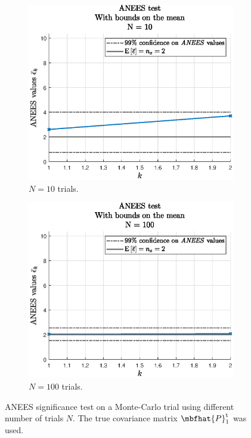 \documentclass{simple-article}
\begin{document}
\begin{figure}[H]
  \centering
  \begin{subfigure}{0.45\textwidth}
    \includegraphics[width=\textwidth]{../figs/anees_N10.eps}
    \caption{$N=10$ trials.}
    \label{fig:anees_N10}
  \end{subfigure}
  \begin{subfigure}{0.45\textwidth}
    \includegraphics[width=\textwidth]{../figs/anees_N100.eps}
    \caption{$N=100$ trials.}
    \label{fig:anees_N100}
  \end{subfigure}
  \caption{ANEES significance test on a Monte-Carlo trial using different number of trials $N$. The true covariance matrix $\mbfhat{P}_{1}^{\mathrm{t}}$ was used.}
  \label{fig:ANEES KF MCT true P}
\end{figure}
\end{document}
